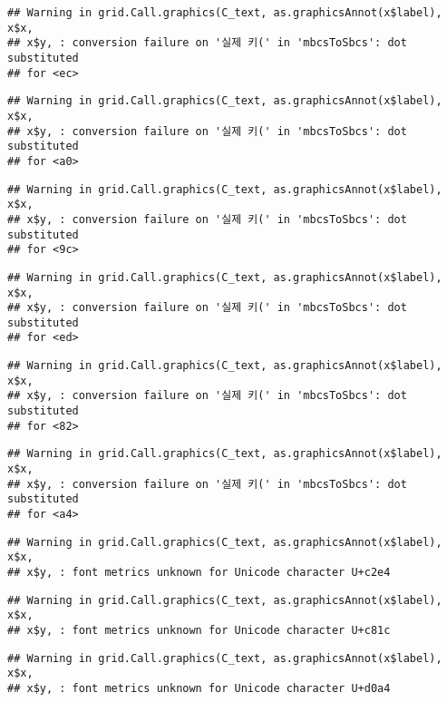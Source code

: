 \documentclass[]{book}
\begin{document}
\begin{verbatim}
## Warning in grid.Call.graphics(C_text, as.graphicsAnnot(x$label), x$x,
## x$y, : conversion failure on '실제 키(' in 'mbcsToSbcs': dot substituted
## for <ec>
\end{verbatim}

\begin{verbatim}
## Warning in grid.Call.graphics(C_text, as.graphicsAnnot(x$label), x$x,
## x$y, : conversion failure on '실제 키(' in 'mbcsToSbcs': dot substituted
## for <a0>
\end{verbatim}

\begin{verbatim}
## Warning in grid.Call.graphics(C_text, as.graphicsAnnot(x$label), x$x,
## x$y, : conversion failure on '실제 키(' in 'mbcsToSbcs': dot substituted
## for <9c>
\end{verbatim}

\begin{verbatim}
## Warning in grid.Call.graphics(C_text, as.graphicsAnnot(x$label), x$x,
## x$y, : conversion failure on '실제 키(' in 'mbcsToSbcs': dot substituted
## for <ed>
\end{verbatim}

\begin{verbatim}
## Warning in grid.Call.graphics(C_text, as.graphicsAnnot(x$label), x$x,
## x$y, : conversion failure on '실제 키(' in 'mbcsToSbcs': dot substituted
## for <82>
\end{verbatim}

\begin{verbatim}
## Warning in grid.Call.graphics(C_text, as.graphicsAnnot(x$label), x$x,
## x$y, : conversion failure on '실제 키(' in 'mbcsToSbcs': dot substituted
## for <a4>
\end{verbatim}

\begin{verbatim}
## Warning in grid.Call.graphics(C_text, as.graphicsAnnot(x$label), x$x,
## x$y, : font metrics unknown for Unicode character U+c2e4
\end{verbatim}

\begin{verbatim}
## Warning in grid.Call.graphics(C_text, as.graphicsAnnot(x$label), x$x,
## x$y, : font metrics unknown for Unicode character U+c81c
\end{verbatim}

\begin{verbatim}
## Warning in grid.Call.graphics(C_text, as.graphicsAnnot(x$label), x$x,
## x$y, : font metrics unknown for Unicode character U+d0a4
\end{verbatim}
\end{document}
